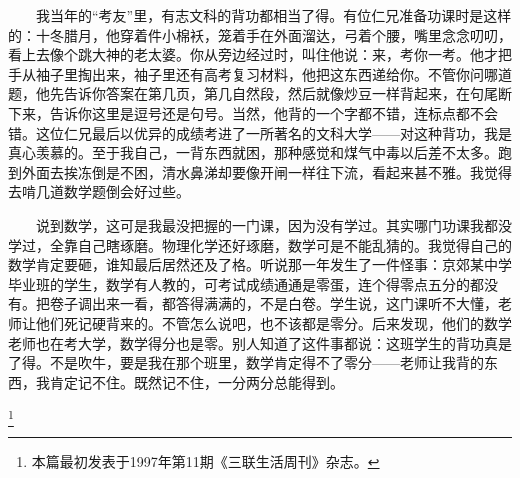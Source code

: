 　　我当年的“考友”里，有志文科的背功都相当了得。有位仁兄准备功课时是这样的：十冬腊月，他穿着件小棉袄，笼着手在外面溜达，弓着个腰，嘴里念念叨叨，看上去像个跳大神的老太婆。你从旁边经过时，叫住他说：来，考你一考。他才把手从袖子里掏出来，袖子里还有高考复习材料，他把这东西递给你。不管你问哪道题，他先告诉你答案在第几页，第几自然段，然后就像炒豆一样背起来，在句尾断下来，告诉你这里是逗号还是句号。当然，他背的一个字都不错，连标点都不会错。这位仁兄最后以优异的成绩考进了一所著名的文科大学——对这种背功，我是真心羡慕的。至于我自己，一背东西就困，那种感觉和煤气中毒以后差不太多。跑到外面去挨冻倒是不困，清水鼻涕却要像开闸一样往下流，看起来甚不雅。我觉得去啃几道数学题倒会好过些。

　　说到数学，这可是我最没把握的一门课，因为没有学过。其实哪门功课我都没学过，全靠自己瞎琢磨。物理化学还好琢磨，数学可是不能乱猜的。我觉得自己的数学肯定要砸，谁知最后居然还及了格。听说那一年发生了一件怪事：京郊某中学毕业班的学生，数学有人教的，可考试成绩通通是零蛋，连个得零点五分的都没有。把卷子调出来一看，都答得满满的，不是白卷。学生说，这门课听不大懂，老师让他们死记硬背来的。不管怎么说吧，也不该都是零分。后来发现，他们的数学老师也在考大学，数学得分也是零。别人知道了这件事都说：这班学生的背功真是了得。不是吹牛，要是我在那个班里，数学肯定得不了零分——老师让我背的东西，我肯定记不住。既然记不住，一分两分总能得到。

\footnote{本篇最初发表于1997年第11期《三联生活周刊》杂志。}
